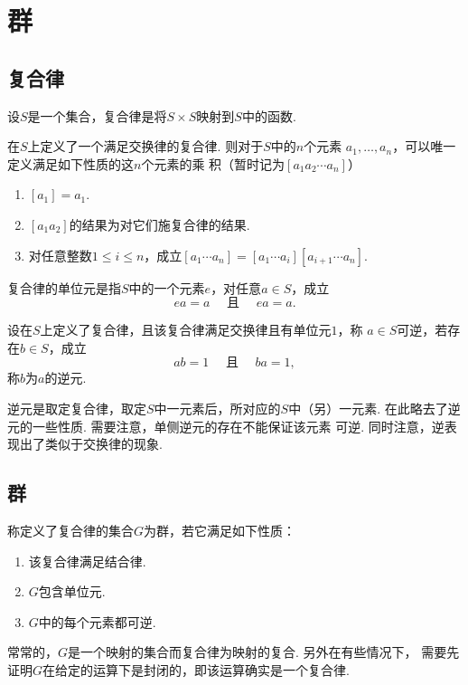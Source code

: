 \section{群}

\subsection{复合律}

  \begin{defi}
    设$S$是一个集合，复合律是将$S\times S$映射到$S$中的函数.
  \end{defi}

  \begin{pos}[唯一性]
    在$S$上定义了一个满足交换律的复合律. 则对于$S$中的$n$个元素
    $a_1,\dots,a_n$，可以唯一定义满足如下性质的这$n$个元素的乘
    积（暂时记为$[a_1a_2\cdots a_n]$）
    \begin{enumerate}
      \item $[a_1]=a_1$.
      \item $[a_1a_2]$的结果为对它们施复合律的结果.
      \item 对任意整数$1\le i\le n$，成立$[a_1\cdots a_n] =
        [a_1\cdots a_i][a_{i+1}\cdots a_n]$.
    \end{enumerate}
  \end{pos}

  \begin{defi}[单位元]
    复合律的单位元是指$S$中的一个元素$e$，对任意$a\in S$，成立
    \[
      ea=a \quad \text{ 且 } \quad ea = a.
    \]
  \end{defi}

  \begin{defi}[逆]
    设在$S$上定义了复合律，且该复合律满足交换律且有单位元$1$，称
    $a\in S$可逆，若存在$b\in S$，成立
    \[
      ab=1 \quad \text{ 且 } \quad ba = 1,
    \]
    称$b$为$a$的逆元.
  \end{defi}
  \remark
    逆元是取定复合律，取定$S$中一元素后，所对应的$S$中（另）一元素.
    在此略去了逆元的一些性质. 需要注意，单侧逆元的存在不能保证该元素
    可逆. 同时注意，逆表现出了类似于交换律的现象.

\subsection{群}

  \begin{defi}[群]
    称定义了复合律的集合$G$为群，若它满足如下性质：
    \begin{enumerate}
      \item 该复合律满足结合律.
      \item $G$包含单位元.
      \item $G$中的每个元素都可逆.
    \end{enumerate}
  \end{defi}
  \remark
    常常的，$G$是一个映射的集合而复合律为映射的复合. 另外在有些情况下，
    需要先证明$G$在给定的运算下是封闭的，即该运算确实是一个复合律.

